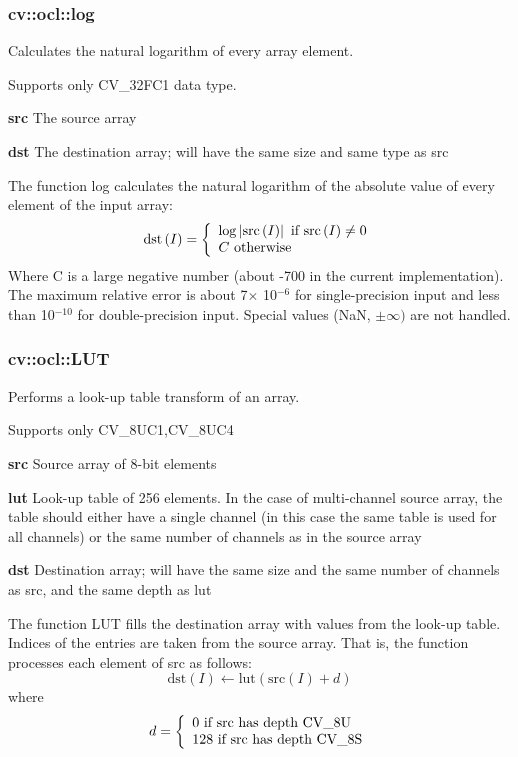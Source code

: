 \documentclass{article}
\begin{document}
\newpage

\subsubsection{cv::ocl::log }
\label{subsubsec:mylabel16}
Calculates the natural logarithm of every array element.

Supports only CV{\_}32FC1 data type.

\textbf{src }The source array

\textbf{dst }The destination array; will have the same size and same type as
src

The function log calculates the natural logarithm of the absolute value of
every element of the input array:
\[
\mbox{dst}\left( I \right)=\left\{ {{\begin{array}{*{20}c}
 {\log \left| {\mbox{src}\left( I \right)} \right|\mbox{ if src}\left( I
\right)\ne 0} \hfill \\
 {C\mbox{ otherwise}} \hfill \\
\end{array} }} \right.
\]
Where C is a large negative number (about -700 in the current
implementation). The maximum relative error is about 7$\times $ 10$^{-6}$
for single-precision input and less than 10$^{-10}$ for double-precision
input. Special values (NaN, $\pm \infty )$ are not handled.

\newpage

\subsubsection{cv::ocl::LUT}
\label{subsubsec:mylabel17}
Performs a look-up table transform of an array.

Supports only CV{\_}8UC1,CV{\_}8UC4

\textbf{src }Source array of 8-bit elements

\textbf{lut }Look-up table of 256 elements. In the case of multi-channel
source array, the table should either have a single channel (in this case
the same table is used for all channels) or the same number of channels as
in the source array

\textbf{dst }Destination array; will have the same size and the same number
of channels as src, and the same depth as lut

The function LUT fills the destination array with values from the look-up
table. Indices of the entries are taken from the source array. That is, the
function processes each element of src as follows:
\[
\mbox{dst}(I)\leftarrow \mbox{lut}(\mbox{src}(I)+d)
\]
where
\[
d=\left\{ {{\begin{array}{*{20}c}
 {\mbox{0 if src has depth CV\_8U}} \hfill \\
 {\mbox{128 if src has depth CV\_8S}} \hfill \\
\end{array} }} \right.
\]
\newpage
\end{document}
